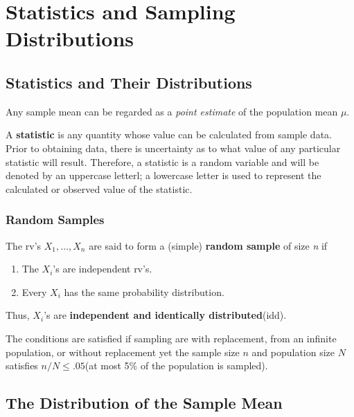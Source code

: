 \chapter{Statistics and Sampling Distributions}

\section{Statistics and Their Distributions}

Any sample mean can be regarded as a \textit{point estimate} of the population mean $\mu$.

\begin{definition}
    A \textbf{statistic} is any quantity whose value can be calculated from sample data. Prior to obtaining data, there is uncertainty as to what value of any particular statistic will result. Therefore, a statistic is a random variable and will be denoted by an uppercase letterl; a lowercase letter is used to represent the calculated or observed value of the statistic.
\end{definition}

\subsection{Random Samples}

\begin{definition}
    The rv's $X_1,\dots,X_n$ are said to form a (simple) \textbf{random sample} of size \textit{n} if 

    \begin{enumerate}
        \item The $X_i$'s are independent rv's.
        \item Every $X_i$ has the same probability distribution.
    \end{enumerate}

    Thus, $X_i$'s are \textbf{independent and identically distributed}(idd).

    The conditions are satisfied if sampling are with replacement, from an infinite population, or without replacement yet the sample size $n$ and population size $N$ satisfies $n/N\leq .05$(at most 5\% of the population is sampled).
\end{definition}

\section{The Distribution of the Sample Mean}

